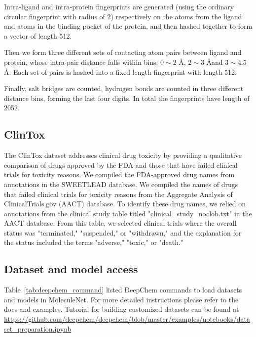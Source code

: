 Intra-ligand and intra-protein fingerprints are generated (using the ordinary circular fingerprint with radius of 2) respectively on the atoms from the ligand and atoms in the binding pocket of the protein, and then hashed together to form a vector of length 512.

Then we form three different sets of contacting atom pairs between ligand and protein, whose intra-pair distance falls within bins: $0\sim2$ \AA, $2\sim3$ \AA and $3\sim4.5$ \AA. Each set of pairs is hashed into a fixed length fingerprint with length 512.

Finally, salt bridges are counted, hydrogen bonds are counted in three different distance bins, forming the last four digits. In total the fingerprints have length of 2052.


\subsection{ClinTox}

The ClinTox dataset addresses clinical drug toxicity by providing a qualitative comparison of drugs approved by the FDA and those that have failed clinical trials for toxicity reasons. We compiled the FDA-approved drug names from annotations in the SWEETLEAD database. We compiled the names of drugs that failed clinical trials for toxicity reasons from the Aggregate Analysis of ClinicalTrials.gov (AACT) database. To identify these drug names, we relied on annotations from the clinical study table titled "clinical\_study\_noclob.txt" in the AACT database. From this table, we selected clinical trials where the overall status was "terminated," "suspended," or "withdrawn," and the explanation for the status included the terms "adverse," "toxic," or "death."

\subsection{Dataset and model access}

Table~\ref{tab:deepchem_command} listed DeepChem commands to load datasets and models in MoleculeNet. For more detailed instructions please refer to the docs and examples. Tutorial for building customized datasets can be found at \url{https://github.com/deepchem/deepchem/blob/master/examples/notebooks/dataset_preparation.ipynb}


